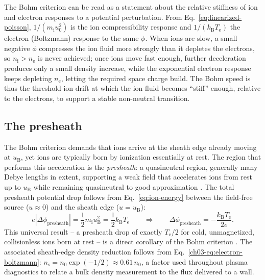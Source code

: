 The Bohm criterion can be read as a statement about the relative stiffness of ion and electron responses to a potential perturbation. From Eq.~\eqref{eq:linearized-poisson}, $1/(m_{\mathrm{i}} u_{0}^{2})$ is the ion compressibility response and $1/(k_{\mathrm{B}} T_{\mathrm{e}})$ the electron (Boltzmann) response to the same $\phi$. When ions are slow, a small negative $\phi$ compresses the ion fluid more strongly than it depletes the electrons, so $n_{\mathrm{i}} > n_{\mathrm{e}}$ is never achieved; once ions move fast enough, further deceleration produces only a small density increase, while the exponential electron response keeps depleting $n_{\mathrm{e}}$, letting the required space charge build. The Bohm speed is thus the threshold ion drift at which the ion fluid becomes ``stiff'' enough, relative to the electrons, to support a stable non-neutral transition.

\subsection{The presheath}

The Bohm criterion demands that ions arrive at the sheath edge already moving at $u_{\mathrm{B}}$, yet ions are typically born by ionization essentially at rest. The region that performs this acceleration is the \emph{presheath}: a quasineutral region, generally many Debye lengths in extent, supporting a weak field that accelerates ions from rest up to $u_{\mathrm{B}}$ while remaining quasineutral to good approximation \cite{ref0006,ref0013}. The total presheath potential drop follows from Eq.~\eqref{eq:ion-energy} between the field-free source ($u\approx0$) and the sheath edge ($u=u_{\mathrm{B}}$):
\begin{equation}
e \left| \Delta \phi_{\mathrm{presheath}} \right| = \frac{1}{2} m_{\mathrm{i}} u_{\mathrm{B}}^{2} = \frac{1}{2} k_{\mathrm{B}} T_{\mathrm{e}} \qquad \Longrightarrow \qquad \Delta\phi_{\mathrm{presheath}} = -\frac{k_{\mathrm{B}} T_{\mathrm{e}}}{2e}.
\label{eq:presheath-drop}
\end{equation}
This universal result -- a presheath drop of exactly $T_{\mathrm{e}}/2$ for cold, unmagnetized, collisionless ions born at rest -- is a direct corollary of the Bohm criterion \cite{ref0013,ref0023}. The associated sheath-edge density reduction follows from Eq.~\eqref{ch03-eq:electron-boltzmann}: $n_{\mathrm{s}} = n_{0} \exp(-1/2) \approx 0.61\, n_{0}$, a factor used throughout plasma diagnostics to relate a bulk density measurement to the flux delivered to a wall.

